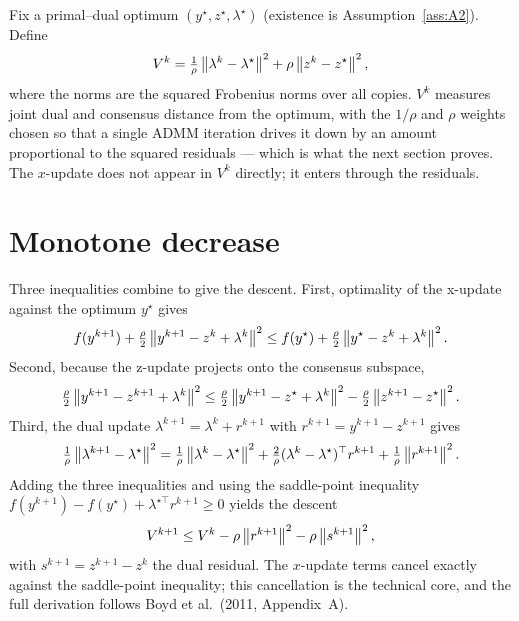 \documentclass[11pt]{article}
\begin{document}
Fix a primal--dual optimum $(y^\star, z^\star, \lambda^\star)$ (existence is
Assumption~\ref{ass:A2}). Define
\begin{equation}
V^k = \tfrac{1}{\rho}\left\lVert \lambda^k - \lambda^\star \right\rVert^2 + \rho\left\lVert z^k - z^\star \right\rVert^2,
\label{eq:V}
\end{equation}
where the norms are the squared Frobenius norms over all copies. $V^k$ measures joint dual
and consensus distance from the optimum, with the $1/\rho$ and $\rho$ weights chosen so
that a single ADMM iteration drives it down by an amount proportional to the squared
residuals --- which is what the next section proves. The $x$-update does not appear in
$V^k$ directly; it enters through the residuals.

\section{Monotone decrease}

Three inequalities combine to give the descent. First, optimality of the x-update against
the optimum $y^\star$ gives
\begin{equation}
f(y^{k+1}) + \tfrac{\rho}{2}\left\lVert y^{k+1} - z^k + \lambda^k \right\rVert^2
\le f(y^\star) + \tfrac{\rho}{2}\left\lVert y^\star - z^k + \lambda^k \right\rVert^2.
\end{equation}
Second, because the z-update projects onto the consensus subspace,
\begin{equation}
\tfrac{\rho}{2}\left\lVert y^{k+1} - z^{k+1} + \lambda^k \right\rVert^2
\le \tfrac{\rho}{2}\left\lVert y^{k+1} - z^\star + \lambda^k \right\rVert^2
- \tfrac{\rho}{2}\left\lVert z^{k+1} - z^\star \right\rVert^2.
\end{equation}
Third, the dual update $\lambda^{k+1} = \lambda^k + r^{k+1}$ with
$r^{k+1} = y^{k+1} - z^{k+1}$ gives
\begin{equation}
\tfrac{1}{\rho}\left\lVert \lambda^{k+1} - \lambda^\star \right\rVert^2
= \tfrac{1}{\rho}\left\lVert \lambda^k - \lambda^\star \right\rVert^2
+ \tfrac{2}{\rho}(\lambda^k - \lambda^\star)^\top r^{k+1}
+ \tfrac{1}{\rho}\left\lVert r^{k+1} \right\rVert^2.
\end{equation}
Adding the three inequalities and using the saddle-point inequality
$f(y^{k+1}) - f(y^\star) + \lambda^{\star\top} r^{k+1} \ge 0$ yields the descent
\begin{equation}
V^{k+1} \le V^k - \rho\left\lVert r^{k+1} \right\rVert^2 - \rho\left\lVert s^{k+1} \right\rVert^2,
\label{eq:descent}
\end{equation}
with $s^{k+1} = z^{k+1} - z^k$ the dual residual. The $x$-update terms cancel exactly
against the saddle-point inequality; this cancellation is the technical core, and the full
derivation follows Boyd et al.~(2011, Appendix~A).
\end{document}
